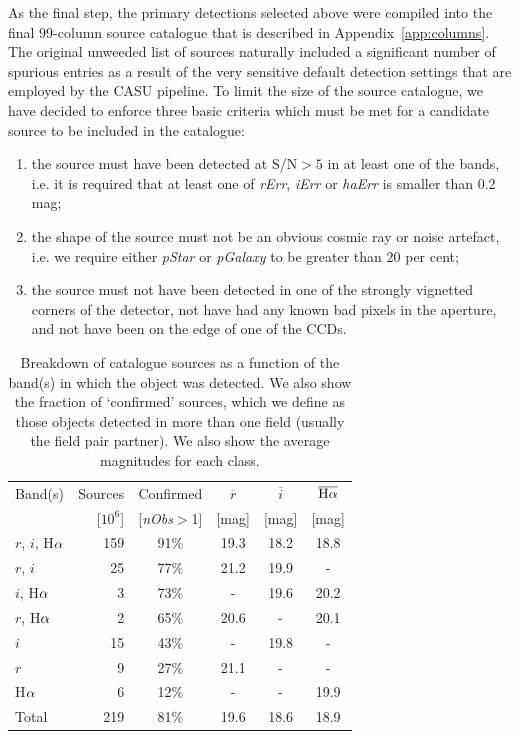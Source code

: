 \documentclass[a4paper,useAMS,usenatbib]{mn2e}
\def\ha{\mbox{H$\rm \alpha$}}
\begin{document}
As the final step, the primary detections
selected above were compiled
into the final 99-column source catalogue
that is described in Appendix~\ref{app:columns}.
The original unweeded list of sources naturally included 
a significant number of spurious entries
as a result of the very sensitive default detection settings
that are employed by the CASU pipeline.
To limit the size of the source catalogue,
we have decided to enforce three basic criteria
which must be met for a candidate source
to be included in the catalogue:
\begin{enumerate}
\item the source must have been detected at S/N$>5$ in at least
one of the bands, i.e. it is required that at least one of
\emph{rErr}, \emph{iErr} or \emph{haErr} is smaller
than 0.2 mag;
\item the shape of the source must not be an obvious
cosmic ray or noise artefact, i.e. we require
either \emph{pStar} or \emph{pGalaxy} to be
greater than 20 per cent;
\item the source must not have been detected in one of the strongly
vignetted corners of the detector, 
not have had any known bad pixels in the aperture,
and not have been on the edge of one of the CCDs.
\end{enumerate}

\begin{table}
    \caption{Breakdown of catalogue sources as a function of the band(s)
             in which the object was detected.
             We also show the fraction of `confirmed' sources,
             which we define as those objects
             detected in more than one field
             (usually the field pair partner).
             We also show the average magnitudes for each class.}
    \label{tbl:detections}
    \begin{center}
        \begin{tabular}{lrcccc}
        \toprule
        Band(s) & Sources & Confirmed & $\overline{r}$ & $\overline{i}$ & $\overline{\ha}$ \\
        & [$10^6$] & [\emph{nObs}$>$1] & [mag] & [mag] & [mag] \\
        \midrule
        $r$, $i$, \ha & 159 & 91\% & 19.3 & 18.2 & 18.8  \\
        $r$, $i$ & 25 & 77\% & 21.2 & 19.9 & - \\
        $i$, \ha & 3 & 73\% & - & 19.6 & 20.2 \\
        $r$, \ha & 2 & 65\% & 20.6 & - & 20.1 \\
        $i$ & 15 & 43\% & - & 19.8 & - \\
        $r$ & 9 & 27\% & 21.1 & - & - \\
        \ha & 6 & 12\% & - & - & 19.9 \\
        \midrule
        Total  & 219 & 81\% & 19.6 & 18.6 & 18.9 \\
        \bottomrule
        \end{tabular}
	\end{center}
\end{table}
\end{document}
